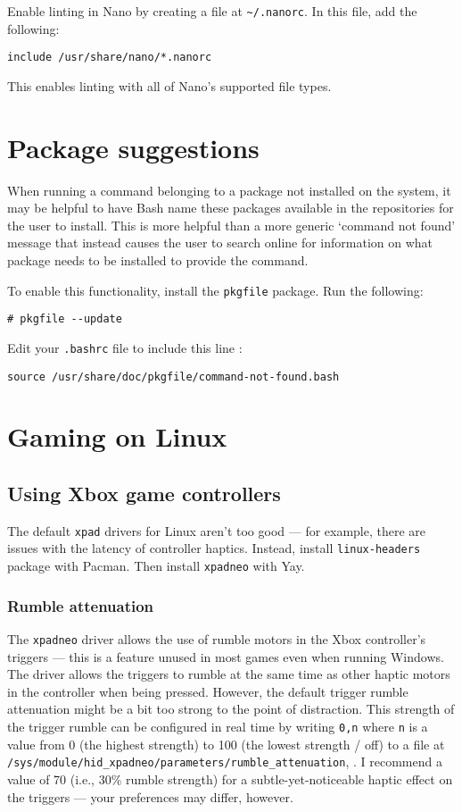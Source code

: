 \documentclass[a4paper]{article}
\begin{document}
Enable linting in Nano by creating a file at \lstinline|~/.nanorc|.
In this file, add the following:
\begin{lstlisting}
include /usr/share/nano/*.nanorc
\end{lstlisting}
This enables linting with all of Nano's supported file types.

\section{Package suggestions}

When running a command belonging to a package not installed on the system, it may be helpful to have Bash name these packages available in the repositories for the user to install.
This is more helpful than a more generic `command not found' message that instead causes the user to search online for information on what package needs to be installed to provide the command.

To enable this functionality, install the \lstinline|pkgfile| package.
Run the following:
\begin{lstlisting}
# pkgfile --update
\end{lstlisting}
Edit your \lstinline|.bashrc| file to include this line \cite{arch-command-not-found}:
\begin{lstlisting}
source /usr/share/doc/pkgfile/command-not-found.bash
\end{lstlisting}

\section{Gaming on Linux}

\subsection{Using Xbox game controllers}

The default \lstinline|xpad| drivers for Linux aren't too good --- for example, there are issues with the latency of controller haptics.
Instead, install \lstinline|linux-headers| package with Pacman.
Then install \lstinline|xpadneo| with Yay.

\subsubsection{Rumble attenuation}

The \lstinline|xpadneo| driver allows the use of rumble motors in the Xbox controller's triggers --- this is a feature unused in most games even when running Windows.
The driver allows the triggers to rumble at the same time as other haptic motors in the controller when being pressed.
However, the default trigger rumble attenuation might be a bit too strong to the point of distraction.
This strength of the trigger rumble can be configured in real time by writing \lstinline|0,n|  where \lstinline|n| is a value from 0 (the highest strength) to 100 (the lowest strength / off) to a file at \lstinline|/sys/module/hid_xpadneo/parameters/rumble_attenuation|, \cite{xpadneo-troubleshooting}.
I recommend a value of 70 (i.e., 30\% rumble strength) for a subtle-yet-noticeable haptic effect on the triggers --- your preferences may differ, however.
\end{document}
